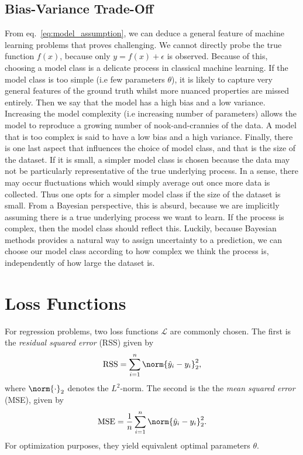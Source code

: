 \subsection{Bias-Variance Trade-Off}\label{sec:bias_var}
From eq.~\eqref{eq:model_assumption}, we can deduce a general feature of machine learning problems that proves challenging. 
We cannot directly probe the true function $f(x)$, because only $y = f(x) + \epsilon$ is observed. 
Because of this, choosing a model class is a delicate process in classical machine learning. 
If the model class is too simple (i.e few parameters $\theta$), 
it is likely to capture very general features of the ground truth whilst more nuanced properties are missed entirely. 
Then we say that the model has a high bias and a low variance. Increasing the model complexity 
(i.e increasing number of parameters) allows the model to reproduce a growing number of nook-and-crannies of the data. 
A model that is too complex is said to have a low bias and a high variance. Finally, there is one last aspect that
influences the choice of model class, and that is the size of the dataset. If it is small, a simpler model class is chosen
because the data may not be particularly representative of the true underlying process. In a sense, there may occur
fluctuations which would simply average out once more data is collected. Thus one opts for a simpler model class
if the size of the dataset is small. From a Bayesian perspective, this is absurd, because we are implicitly assuming
there is a true underlying process we want to learn. If the process is complex, then the model class should reflect this.
Luckily, because Bayesian methods provides a natural way to assign uncertainty to a prediction, we can choose our
model class according to how complex we think the process is, independently of how large the dataset is.


\section{Loss Functions}
For regression problems, two loss functions $\mathcal{L}$ are commonly chosen. The first is the \textit{residual squared error} (RSS) given by
\begin{equation}
	\text{RSS} = \sum_{i=1}^n \norm{\hat{y}_i - y_i}_2^2,
\end{equation}
where $\norm{\cdot}_2$ denotes the $L^2$-norm. The second is the the \textit{mean squared error} (MSE), given by
\begin{equation}
	\text{MSE} = \frac{1}{n}\sum_{i=1}^n\norm{\hat{y}_i - y_i}_2^2.
\end{equation}
For optimization purposes, they yield equivalent optimal parameters $\theta$. 


